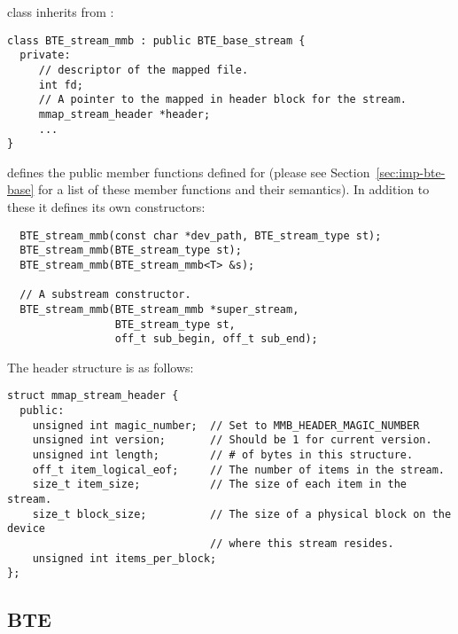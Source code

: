  class inherits from :
\begin{verbatim}
class BTE_stream_mmb : public BTE_base_stream {
  private:
     // descriptor of the mapped file.  
     int fd;   
     // A pointer to the mapped in header block for the stream. 
     mmap_stream_header *header;
     ...
}  
\end{verbatim}

 defines the public member
functions defined for  (please see
Section~\ref{sec:imp-bte-base} for a list of these member
functions and their semantics).  In addition to these it
defines its own constructors: 
\begin{verbatim}
  BTE_stream_mmb(const char *dev_path, BTE_stream_type st);
  BTE_stream_mmb(BTE_stream_type st); 
  BTE_stream_mmb(BTE_stream_mmb<T> &s); 
  
  // A substream constructor.
  BTE_stream_mmb(BTE_stream_mmb *super_stream,
                 BTE_stream_type st,
                 off_t sub_begin, off_t sub_end);
\end{verbatim}

The  header
structure is as follows:

\begin{verbatim}
struct mmap_stream_header { 
  public:
    unsigned int magic_number;  // Set to MMB_HEADER_MAGIC_NUMBER
    unsigned int version;       // Should be 1 for current version.
    unsigned int length;        // # of bytes in this structure.
    off_t item_logical_eof;     // The number of items in the stream.
    size_t item_size;           // The size of each item in the stream.
    size_t block_size;          // The size of a physical block on the device
                                // where this stream resides.
    unsigned int items_per_block;
};
\end{verbatim}




\subsection{BTE }

